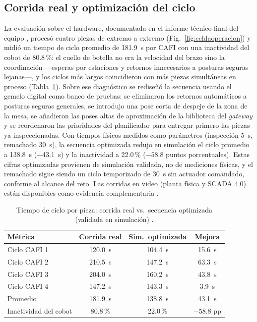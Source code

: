 \documentclass{styles/svproc}
\begin{document}
\subsection{Corrida real y optimización del ciclo}
La evaluación sobre el hardware, documentada en el informe técnico final
del equipo \cite{informe2026}, procesó cuatro piezas de extremo a extremo
(Fig.~\ref{fig:celdaoperacion}) y midió un tiempo de ciclo promedio de
\SI{181.9}{\second} por CAFI con una inactividad del cobot de 80.8\,\%: el cuello de botella no era la velocidad
del brazo sino la coordinación ---esperas por estaciones y retornos
innecesarios a posturas seguras lejanas---, y los ciclos más largos
coincidieron con más piezas simultáneas en proceso
(Tabla~\ref{tab:ciclos}). Sobre ese diagnóstico se rediseñó la secuencia
usando el gemelo digital como banco de pruebas: se eliminaron los retornos
automáticos a posturas seguras generales, se introdujo una pose corta de
despeje de la zona de la mesa, se añadieron las poses altas de aproximación
de la biblioteca del \emph{gateway} y se reordenaron las prioridades del
planificador para entregar primero las piezas ya inspeccionadas. Con
tiempos físicos medidos como parámetros (inspección \SI{5}{\second},
remachado \SI{30}{\second}), la secuencia optimizada redujo en simulación
el ciclo promedio a \SI{138.8}{\second} ($-$\SI{43.1}{\second}) y la
inactividad a 22.0\,\% ($-58.8$ puntos porcentuales). Estas cifras
optimizadas provienen de simulación validada, no de mediciones físicas, y
el remachado sigue siendo un ciclo temporizado de \SI{30}{\second} sin
actuador comandado, conforme al alcance del reto. Las corridas en video
(planta física y SCADA 4.0) están disponibles como evidencia complementaria
\cite{videoplanta,videoscada}.

\begin{table}[t]
  \caption{Tiempo de ciclo por pieza: corrida real vs.\ secuencia
  optimizada (validada en simulación) \cite{informe2026}.}
  \label{tab:ciclos}
  \centering
  \scriptsize
  \begin{tabular}{@{}lccc@{}}
    \toprule
    Métrica & Corrida real & Sim.\ optimizada & Mejora \\
    \midrule
    Ciclo CAFI 1 & \SI{120.0}{\second} & \SI{104.4}{\second} & \SI{15.6}{\second} \\
    Ciclo CAFI 2 & \SI{210.5}{\second} & \SI{147.2}{\second} & \SI{63.3}{\second} \\
    Ciclo CAFI 3 & \SI{204.0}{\second} & \SI{160.2}{\second} & \SI{43.8}{\second} \\
    Ciclo CAFI 4 & \SI{147.2}{\second} & \SI{143.3}{\second} & \SI{3.9}{\second} \\
    Promedio & \SI{181.9}{\second} & \SI{138.8}{\second} & \SI{43.1}{\second} \\
    Inactividad del cobot & 80.8\,\% & 22.0\,\% & $-58.8$ pp \\
    \bottomrule
  \end{tabular}
\end{table}
\end{document}
